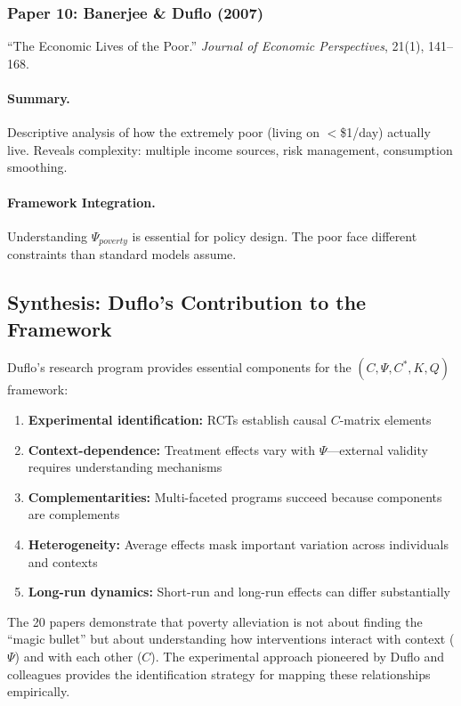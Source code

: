 \subsubsection{Paper 10: Banerjee \& Duflo (2007)}

``The Economic Lives of the Poor.''
\textit{Journal of Economic Perspectives}, 21(1), 141--168.

\paragraph{Summary.}
Descriptive analysis of how the extremely poor (living on $<$\$1/day) actually live.
Reveals complexity: multiple income sources, risk management, consumption smoothing.

\paragraph{Framework Integration.}
Understanding $\Psi_{poverty}$ is essential for policy design. The poor face
different constraints than standard models assume.

\subsection{Synthesis: Duflo's Contribution to the Framework}

Duflo's research program provides essential components for the $(C, \Psi, C^*, K, Q)$ framework:
\begin{enumerate}
  \item \textbf{Experimental identification:} RCTs establish causal $C$-matrix elements
  \item \textbf{Context-dependence:} Treatment effects vary with $\Psi$---external validity requires
        understanding mechanisms
  \item \textbf{Complementarities:} Multi-faceted programs succeed because components are complements
  \item \textbf{Heterogeneity:} Average effects mask important variation across individuals and contexts
  \item \textbf{Long-run dynamics:} Short-run and long-run effects can differ substantially
\end{enumerate}

The 20 papers demonstrate that poverty alleviation is not about finding the ``magic
bullet'' but about understanding how interventions interact with context ($\Psi$) and with
each other ($C$). The experimental approach pioneered by Duflo and colleagues provides
the identification strategy for mapping these relationships empirically.

